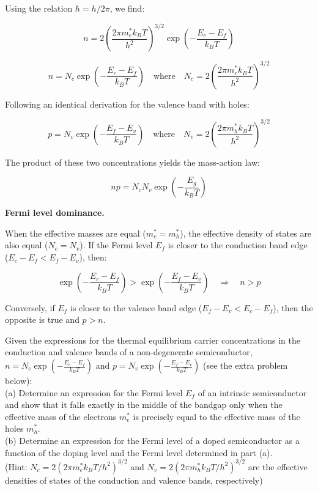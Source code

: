 Using the relation $\hbar = h / 2\pi$, we find:

\begin{equation*}
  n = 2 \left( \frac{2\pi m_e^* k_B T}{h^2} \right)^{3/2} \exp\left(-\frac{E_c - E_f}{k_B T}\right)
\end{equation*}

\begin{equation*}
  \boxed{n = N_c \exp\left(-\frac{E_c - E_f}{k_B T}\right)} \quad \text{where} \quad N_c = 2 \left( \frac{2\pi m_e^* k_B T}{h^2} \right)^{3/2}
\end{equation*}

Following an identical derivation for the valence band with holes:

\begin{equation*}
  \boxed{p = N_v \exp\left(-\frac{E_f - E_v}{k_B T}\right)} \quad \text{where} \quad N_v = 2 \left( \frac{2\pi m_h^* k_B T}{h^2} \right)^{3/2}
\end{equation*}

The product of these two concentrations yields the mass-action law:

\begin{equation*}
  \boxed{np = N_c N_v \exp\left(-\frac{E_g}{k_B T}\right)}
\end{equation*}

\textbf{Fermi level dominance.}

When the effective masses are equal ($m_e^* = m_h^*$), the effective density of states are also equal ($N_c = N_v$). 
If the Fermi level $E_f$ is closer to the conduction band edge ($E_c - E_f < E_f - E_v$), then:

\begin{equation*}
  \exp\left(-\frac{E_c - E_f}{k_B T}\right) > \exp\left(-\frac{E_f - E_v}{k_B T}\right) \quad\Longrightarrow\quad n > p
\end{equation*}

Conversely, if $E_f$ is closer to the valence band edge ($E_f - E_v < E_c - E_f$), then the opposite is true and $p > n$.

\begin{question}[Question 3]
Given the expressions for the thermal equilibrium carrier concentrations in the conduction and valence bands of a non-degenerate semiconductor, $n = N_c \exp\left(-\frac{E_c - E_f}{k_B T}\right)$ and $p = N_v \exp\left(-\frac{E_f - E_v}{k_B T}\right)$ (see the extra problem below):\\
(a) Determine an expression for the Fermi level $E_f$ of an intrinsic semiconductor and show that it falls exactly in the middle of the bandgap only when the effective mass of the electrons $m_e^*$ is precisely equal to the effective mass of the holes $m_h^*$.\\
(b) Determine an expression for the Fermi level of a doped semiconductor as a function of the doping level and the Fermi level determined in part (a).\\
(Hint: $N_c = 2(2\pi m_e^* k_B T/h^2)^{3/2}$ and $N_v = 2(2\pi m_h^* k_B T/h^2)^{3/2}$ are the effective densities of states of the conduction and valence bands, respectively)
\end{question}

